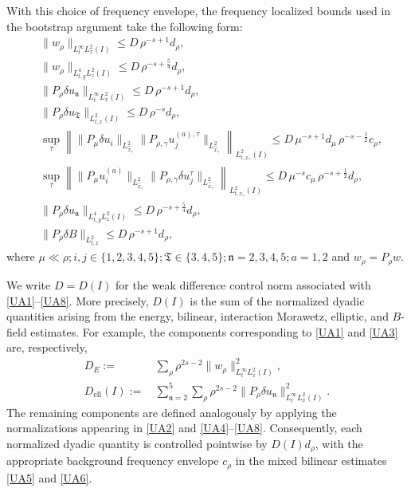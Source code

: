 \documentclass[11pt,letterpaper,reqno]{amsart}
\numberwithin{equation}{section}
\theoremstyle{definition}
\theoremstyle{remark}
\begin{document}
With this choice of frequency envelope, the frequency localized bounds used
in the bootstrap argument take the following form:
\begin{align}
  &  \|w_\rho\|_{L^\infty_tL^2_x(I)}
\leq
D\,\rho^{-s+1}d_\rho,
 \label{UA1} \tag{UA1}  
\\
&\|w_\rho\|_{L^4_{t,y}L^2_z(I)}
\leq
D\,\rho^{-s+\frac54}d_\rho,
 \label{UA2} \tag{UA2}  
\\
&\|P_\rho\delta u_\mathfrak n\|_{L^\infty_tL^2_x(I)}
\leq
D\,\rho^{-s+1}d_\rho,\qquad 
 \label{UA3} \tag{UA3}  
\\
&\|P_\rho\delta u_{\mathfrak T}\|_{L^2_{t,x}(I)}
\leq
D\,\rho^{-s}d_\rho,\qquad  
 \label{UA4} \tag{UA4}  
\\
&\sup_\tau
\left\|
\|P_\mu \delta u_i\|_{L^2_{\widehat x_\gamma}}
\|P_{\rho,\gamma}u_j^{(a),\tau}\|_{L^2_{\widehat x_\gamma}}
\right\|_{L^2_{t,x_\gamma}(I)}
\leq
D\,\mu^{-s+1}d_\mu\,\rho^{-s-\frac12}c_\rho,
 \label{UA5} \tag{UA5}  
\\
&\sup_\tau
\left\|
\|P_\mu u_i^{(a)}\|_{L^2_{\widehat x_\gamma}}
\|P_{\rho,\gamma}\delta u_j^\tau\|_{L^2_{\widehat x_\gamma}}
\right\|_{L^2_{t,x_\gamma}(I)}
\leq
D\,\mu^{-s}c_\mu\,\rho^{-s+\frac12}d_\rho,
 \label{UA6} \tag{UA6}   \\
& \|P_\rho \delta  u_\mathfrak n\|_{L^4_{t,y}L^2_z(I)}
\leq
D\,\rho^{-s+\frac54}d_\rho,
 \label{UA7} \tag{UA7}  
\\
&\|P_\rho\delta B\|_{L^2_{t,x} }
\leq
D\,\rho^{-s+1}d_\rho, 
 \label{UA8} \tag{UA8}  
\end{align}
where \(\mu\ll\rho; i,j\in\{1,2,3,4,5\}; \mathfrak{T}\in\{3,4,5\}; \mathfrak n=2,3,4,5; a=1,2 \) and   \(w_\rho=P_\rho w\).

We write \(D=D(I)\) for the weak difference control norm associated with
\eqref{UA1}--\eqref{UA8}. More precisely, \(D(I)\) is the sum of the
normalized dyadic quantities arising from the energy, bilinear, interaction
Morawetz, elliptic, and \(B\)-field estimates. For example, the components
corresponding to \eqref{UA1} and \eqref{UA3} are, respectively,
\begin{align*}
    D_E:=&\,\sum_\rho
\rho^{2s-2}\|w_\rho\|_{L^\infty_tL^2_x(I)}^2,\\
D_{\mathrm{ell}}(I)
:=&\,
\sum_{\mathfrak{n}=2}^5
\sum_\rho
\rho^{2s-2}
\|P_\rho\delta u_{\mathfrak{n}}\|_{L_t^\infty L_x^2(I)}^2.
\end{align*}
The remaining components are defined analogously by applying the
normalizations appearing in \eqref{UA2} and
\eqref{UA4}--\eqref{UA8}. Consequently, each normalized dyadic quantity is
controlled pointwise by \(D(I)d_\rho\), with the appropriate background
frequency envelope \(c_\rho\) in the mixed bilinear estimates
\eqref{UA5} and \eqref{UA6}.
\end{document}
